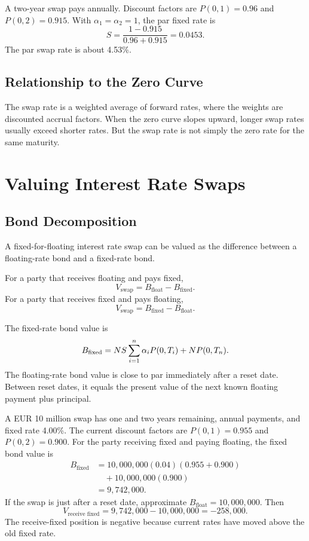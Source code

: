 \begin{exmp}
A two-year swap pays annually. Discount factors are $P(0,1)=0.96$ and
$P(0,2)=0.915$. With $\alpha_1=\alpha_2=1$, the par fixed rate is
\[
    S=\frac{1-0.915}{0.96+0.915}
    =
    0.0453.
\]
The par swap rate is about 4.53\%.
\end{exmp}

\subsection{Relationship to the Zero Curve}

The swap rate is a weighted average of forward rates, where the weights are
discounted accrual factors. When the zero curve slopes upward, longer swap rates
usually exceed shorter rates. But the swap rate is not simply the zero rate for
the same maturity.

\section{Valuing Interest Rate Swaps}

\subsection{Bond Decomposition}

A fixed-for-floating interest rate swap can be valued as the difference between
a floating-rate bond and a fixed-rate bond.

For a party that receives floating and pays fixed,
\[
    V_{\text{swap}}=B_{\text{float}}-B_{\text{fixed}}.
\]
For a party that receives fixed and pays floating,
\[
    V_{\text{swap}}=B_{\text{fixed}}-B_{\text{float}}.
\]

The fixed-rate bond value is
\[
    B_{\text{fixed}}
    =
    N S\sum_{i=1}^n \alpha_i P(0,T_i)
    +N P(0,T_n).
\]
The floating-rate bond value is close to par immediately after a reset date.
Between reset dates, it equals the present value of the next known floating
payment plus principal.

\begin{exmp}
A EUR 10 million swap has one and two years remaining, annual payments, and
fixed rate 4.00\%. The current discount factors are $P(0,1)=0.955$ and
$P(0,2)=0.900$. For the party receiving fixed and paying floating, the fixed
bond value is
\[
\begin{aligned}
    B_{\text{fixed}}
    &=
    10{,}000{,}000(0.04)(0.955+0.900)\\
    &\quad +10{,}000{,}000(0.900)\\
    &=
    9{,}742{,}000.
\end{aligned}
\]
If the swap is just after a reset date, approximate
$B_{\text{float}}=10{,}000{,}000$. Then
\[
    V_{\text{receive fixed}}
    =
    9{,}742{,}000-10{,}000{,}000
    =
    -258{,}000.
\]
The receive-fixed position is negative because current rates have moved above
the old fixed rate.
\end{exmp}

